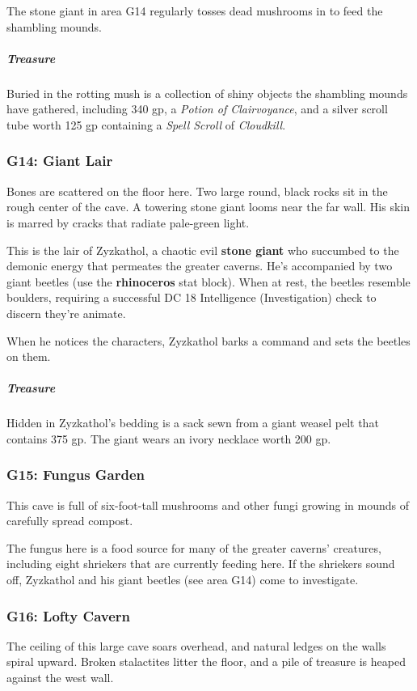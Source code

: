 \documentclass[10pt,a4paper,twoside,bg=print,twocolumn,openany,nodeprecatedcode]{dndbook}
\begin{document}
The stone giant in area G14 regularly tosses dead mushrooms in to feed the shambling mounds.

\subparagraph{Treasure}
Buried in the rotting mush is a collection of shiny objects the shambling mounds have gathered, including 340 gp, a \textit{Potion of Clairvoyance}, and a silver scroll tube worth 125 gp containing a \textit{Spell Scroll} of \textit{Cloudkill}.

\subsubsection{G14: Giant Lair}
\begin{DndReadAloud}{}
Bones are scattered on the floor here. Two large round, black rocks sit in the rough center of the cave. A towering stone giant looms near the far wall. His skin is marred by cracks that radiate pale-green light.

\end{DndReadAloud}

This is the lair of Zyzkathol, a chaotic evil \textbf{stone giant} who succumbed to the demonic energy that permeates the greater caverns. He's accompanied by two giant beetles (use the \textbf{rhinoceros} stat block). When at rest, the beetles resemble boulders, requiring a successful DC 18 Intelligence (Investigation) check to discern they're animate.

When he notices the characters, Zyzkathol barks a command and sets the beetles on them.

\subparagraph{Treasure}
Hidden in Zyzkathol's bedding is a sack sewn from a giant weasel pelt that contains 375 gp. The giant wears an ivory necklace worth 200 gp.

\subsubsection{G15: Fungus Garden}
\begin{DndReadAloud}{}
This cave is full of six-foot-tall mushrooms and other fungi growing in mounds of carefully spread compost.

\end{DndReadAloud}

The fungus here is a food source for many of the greater caverns' creatures, including eight shriekers that are currently feeding here. If the shriekers sound off, Zyzkathol and his giant beetles (see area G14) come to investigate.

\subsubsection{G16: Lofty Cavern}
\begin{DndReadAloud}{}
The ceiling of this large cave soars overhead, and natural ledges on the walls spiral upward. Broken stalactites litter the floor, and a pile of treasure is heaped against the west wall.

\end{DndReadAloud}
\end{document}

